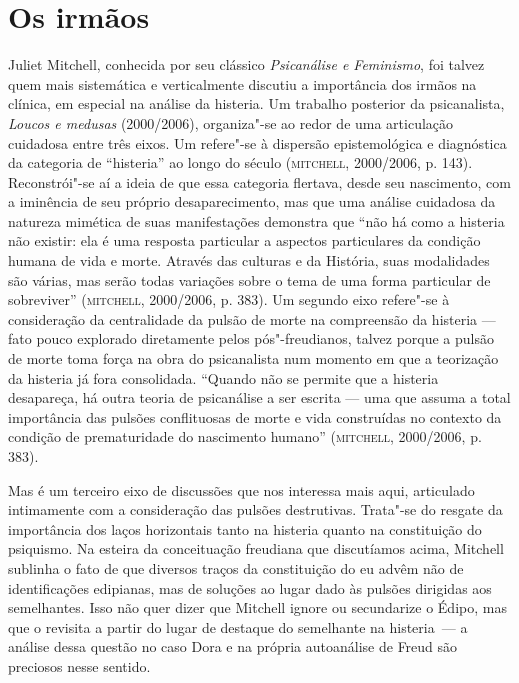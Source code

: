 \section{Os irmãos}

Juliet Mitchell, conhecida por seu clássico \emph{Psicanálise e
Feminismo}, foi talvez quem mais sistemática e verticalmente discutiu a
importância dos irmãos na clínica, em especial na análise da histeria.
Um trabalho posterior da psicanalista, \emph{Loucos e medusas}
(2000/2006), organiza"-se ao redor de uma articulação cuidadosa entre
três eixos. Um refere"-se à dispersão epistemológica e diagnóstica da
categoria de ``histeria'' ao longo do século  (\textsc{mitchell}, 2000/2006, p.
143). Reconstrói"-se aí a ideia de que essa categoria flertava, desde seu
nascimento, com a iminência de seu próprio desaparecimento, mas que uma
análise cuidadosa da natureza mimética de suas manifestações demonstra
que ``não há como a histeria não existir: ela é uma resposta particular
a aspectos particulares da condição humana de vida e morte. Através das
culturas e da História, suas modalidades são várias, mas serão todas
variações sobre o tema de uma forma particular de sobreviver''
(\textsc{mitchell}, 2000/2006, p. 383). Um segundo eixo refere"-se à consideração
da centralidade da pulsão de morte na compreensão da histeria --- fato
pouco explorado diretamente pelos pós"-freudianos, talvez porque a pulsão
de morte toma força na obra do psicanalista num momento em que a
teorização da histeria já fora consolidada. ``Quando não se permite que
a histeria desapareça, há outra teoria de psicanálise a ser escrita ---
uma que assuma a total importância das pulsões conflituosas de morte e
vida construídas no contexto da condição de prematuridade do nascimento
humano'' (\textsc{mitchell}, 2000/2006, p. 383).

Mas é um terceiro eixo de discussões que nos interessa mais aqui,
articulado intimamente com a consideração das pulsões destrutivas.
Trata"-se do resgate da importância dos laços horizontais tanto na
histeria quanto na constituição do psiquismo. Na esteira da conceituação
freudiana que discutíamos acima, Mitchell sublinha o fato de que
diversos traços da constituição do eu advêm não de identificações
edipianas, mas de soluções ao lugar dado às pulsões dirigidas aos
semelhantes. Isso não quer dizer que Mitchell ignore ou secundarize o
Édipo, mas que o revisita a partir do lugar de destaque do semelhante na
histeria~--- a análise dessa questão no caso Dora e na própria
autoanálise de Freud são preciosos nesse sentido.

